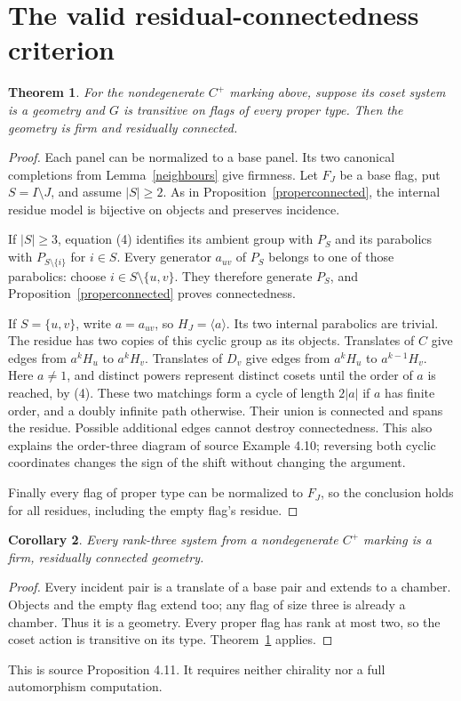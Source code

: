 \documentclass[11pt]{article}
\newtheorem{theorem}{Theorem}[section]
\newtheorem{corollary}[theorem]{Corollary}
\newcommand{\gen}[1]{\langle #1\rangle}
\begin{document}
\section{The valid residual-connectedness criterion}
\begin{theorem}\label{criterion}
For the nondegenerate $C^+$ marking above, suppose its coset system
is a geometry and $G$ is transitive on flags of every proper type.
Then the geometry is firm and residually connected.
\end{theorem}
\begin{proof}
Each panel can be normalized to a base panel. Its two canonical
completions from Lemma~\ref{neighbours} give firmness.
Let $F_J$ be a base flag, put $S=I\setminus J$, and assume
$|S|\geq2$. As in Proposition~\ref{properconnected}, the internal
residue model is bijective on objects and preserves incidence.

If $|S|\geq3$, equation (4) identifies its ambient group with
$P_S$ and its parabolics with $P_{S\setminus\{i\}}$ for $i\in S$.
Every generator $a_{uv}$ of $P_S$ belongs to one of those parabolics:
choose $i\in S\setminus\{u,v\}$. They therefore generate $P_S$,
and Proposition~\ref{properconnected} proves connectedness.

If $S=\{u,v\}$, write $a=a_{uv}$, so $H_J=\gen{a}$.
Its two internal parabolics are trivial. The residue has two
copies of this cyclic group as its objects. Translates of $C$
give edges from $a^kH_u$ to $a^kH_v$. Translates of $D_v$
give edges from $a^kH_u$ to $a^{k-1}H_v$.
Here $a\ne1$, and distinct powers represent distinct cosets
until the order of $a$ is reached, by (4). These two matchings
form a cycle of length $2|a|$ if $a$ has finite order, and a
doubly infinite path otherwise. Their union is connected and
spans the residue. Possible additional edges cannot destroy
connectedness. This also explains the order-three diagram of
source Example 4.10; reversing both cyclic coordinates changes
the sign of the shift without changing the argument.

Finally every flag of proper type can be normalized to $F_J$,
so the conclusion holds for all residues, including the empty
flag's residue.
\end{proof}

\begin{corollary}\label{rankthree}
Every rank-three system from a nondegenerate $C^+$ marking is a
firm, residually connected geometry.
\end{corollary}
\begin{proof}
Every incident pair is a translate of a base pair and extends
to a chamber. Objects and the empty flag extend too; any flag
of size three is already a chamber. Thus it is a geometry.
Every proper flag has rank at most two, so the coset action is
transitive on its type. Theorem~\ref{criterion} applies.
\end{proof}
This is source Proposition 4.11. It requires neither chirality
nor a full automorphism computation.
\end{document}
